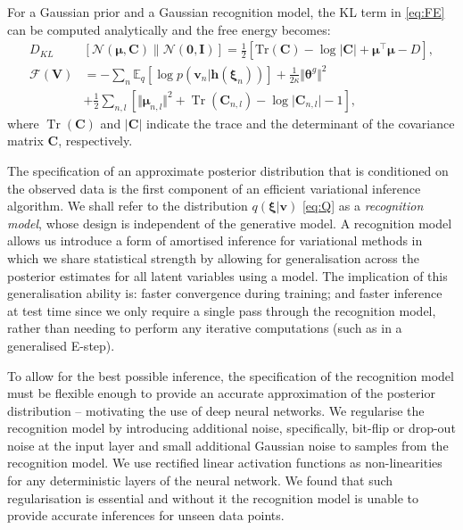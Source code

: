\documentclass{article}
\newcommand{\E}{\mathbb{E}} %
\newcommand{\FE}{\mathcal{F}} %
\DeclareMathOperator{\Tr}{Tr} %
\newcommand{\hid}{\ensuremath{\mathbf{h}}} %
\newcommand{\vis}{\ensuremath{\mathbf{v}}} %
\newcommand{\N}{\mathcal{N}} %
\newcommand{\myvec}[1]{\mbox{$\mathbf{#1}$}}
\newcommand{\myvecsym}[1]{\mbox{$\boldsymbol{#1}$}}
\newcommand{\vzero}{\mbox{$\myvecsym{0}$}}
\newcommand{\vmu}{\mbox{$\myvecsym{\mu}$}}
\newcommand{\vtheta}{\mbox{$\myvecsym{\theta}$}}
\newcommand{\vxi}{\mbox{$\myvecsym{\xi}$}}
\newcommand{\vv}{\mbox{$\myvec{v}$}}
\newcommand{\vC}{\mbox{$\myvec{C}$}}
\newcommand{\vI}{\mbox{$\myvec{I}$}}
\newcommand{\vV}{\mbox{$\myvec{V}$}}
\begin{document}
\begin{bibunit}[icml2013]
For a Gaussian prior and a Gaussian recognition model, the KL term in \eqref{eq:FE} can be computed analytically and the free energy becomes:
\vspace{-1mm}
\begin{align}
D_{\!KL}&[\N(\vmu,\!\vC)\| \N(\vzero, \!\vI)] \!=\! \tfrac{1}{2}\! 
\left[\textrm{Tr}(\!\vC\!)\!-\!\log|\vC| \!+\! \vmu\!^\top\!\!\vmu \!-\!D \right], 
\nonumber \\
\FE(\vV) &= -\sum_n
\E_{q} \left[ \log p(\vis_n| \hid(\vxi_n) ) \right]  
 + \tfrac{1}{2 \kappa} \Vert \vtheta^g\Vert ^2 \nonumber \\
&+\! \frac{1}{2}\! \sum_{n,l}\! \left[ \Vert \vmu_{n,l} \Vert ^2 \!+ \!
\Tr(\vC _{n,l}) \! -\! \log \vert \vC_{n,l} \vert \!-\!1 \right]\!,\! 
\label{eq:FEsimp}
\end{align}
where $\Tr(\vC)$ and $\vert \vC \vert$ indicate the trace and the 
determinant of the covariance matrix $\vC$, respectively.

The specification of an approximate posterior distribution that is conditioned on the observed data is the first component of an efficient variational inference algorithm. We shall refer to the distribution $q(\vxi| \vv)$ \eqref{eq:Q} as a \textit{recognition model}, whose design is independent of the generative model. A recognition model allows us introduce a form of amortised inference \citep{gershman2014} for variational methods in which we share statistical strength by allowing for generalisation across the posterior estimates for all latent variables using a model. The implication of this generalisation ability is: faster convergence during training; and faster inference at test time since we only require a single pass through the recognition model, rather than needing to perform any iterative computations (such as in a generalised E-step). 

To allow for the best possible inference, the specification of the recognition model must be flexible enough to provide an accurate approximation of the posterior distribution -- motivating the use of deep neural networks. 
We regularise the recognition model by introducing additional noise, specifically, bit-flip or drop-out noise at the input layer and small additional Gaussian noise to samples from the recognition model. 
We use rectified linear activation functions as non-linearities for any deterministic layers of the neural network. We found that such regularisation is essential and without it the recognition model is unable to provide accurate inferences for unseen data points. 


\end{bibunit}
\end{document}
